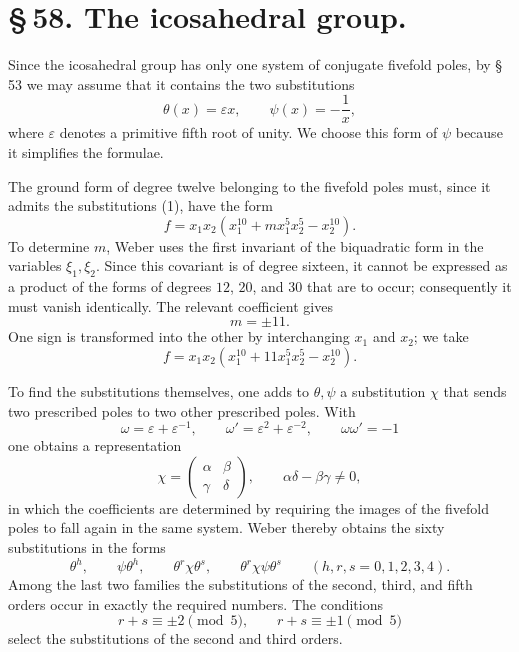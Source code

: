 \documentclass[11pt]{article}
\providecommand{\eps}{\varepsilon}
\providecommand{\eps}{\varepsilon}
\providecommand{\mat}[4]{\begin{pmatrix}#1&#2\\#3&#4\end{pmatrix}}
\providecommand{\mat}[4]{\begin{pmatrix}#1&#2\\#3&#4\end{pmatrix}}
\providecommand{\mat}[1]{\begin{pmatrix}#1\end{pmatrix}}
\begin{document}
\section*{\S\,58. The icosahedral group.}

Since the icosahedral group has only one system of conjugate fivefold poles, by \S\,53 we may assume that it contains the two substitutions
\begin{equation}
 \theta(x)=\eps x,\qquad \psi(x)=-\frac1x,
\tag{1}
\end{equation}
where $\eps$ denotes a primitive fifth root of unity. We choose this form of $\psi$ because it simplifies the formulae.

The ground form of degree twelve belonging to the fivefold poles must, since it admits the substitutions (1), have the form
\begin{equation}
 f=x_1x_2(x_1^{10}+m x_1^5x_2^5-x_2^{10}).
\tag{2}
\end{equation}
To determine $m$, Weber uses the first invariant of the biquadratic form in the variables $\xi_1,\xi_2$. Since this covariant is of degree sixteen, it cannot be expressed as a product of the forms of degrees $12$, $20$, and $30$ that are to occur; consequently it must vanish identically. The relevant coefficient gives
\[
 m=\pm 11.
\]
One sign is transformed into the other by interchanging $x_1$ and $x_2$; we take
\begin{equation}
 f=x_1x_2(x_1^{10}+11x_1^5x_2^5-x_2^{10}).
\tag{3}
\end{equation}

To find the substitutions themselves, one adds to $\theta,\psi$ a substitution $\chi$ that sends two prescribed poles to two other prescribed poles. With
\[
 \omega=\eps+\eps^{-1},\qquad \omega'=\eps^2+\eps^{-2},\qquad
 \omega\omega'=-1
\tag{4}
\]
one obtains a representation
\begin{equation}
 \chi=\mat{\alpha}{\beta}{\gamma}{\delta},
\qquad
 \alpha\delta-\beta\gamma\ne0,
\tag{5}
\end{equation}
in which the coefficients are determined by requiring the images of the fivefold poles to fall again in the same system. Weber thereby obtains the sixty substitutions in the forms
\begin{equation}
 \theta^h,\qquad
 \psi\theta^h,\qquad
 \theta^r\chi\theta^s,\qquad
 \theta^r\chi\psi\theta^s\qquad (h,r,s=0,1,2,3,4).
\tag{6}
\end{equation}
Among the last two families the substitutions of the second, third, and fifth orders occur in exactly the required numbers. The conditions
\[
 r+s\equiv \pm2\pmod5,\qquad r+s\equiv \pm1\pmod5
\]
select the substitutions of the second and third orders.
\end{document}
